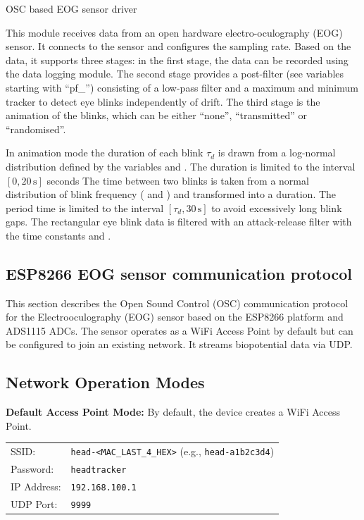 OSC based EOG sensor driver


This module receives data from an open hardware electro-oculography (EOG) sensor. It connects to the sensor and configures the sampling rate. Based on the data, it supports three stages: in the first stage, the data can be recorded using the data logging module. The second stage provides a post-filter (see variables starting with ``pf\_'') consisting of a low-pass filter and a maximum and minimum tracker to detect eye blinks independently of drift. The third stage is the animation of the blinks, which can be either ``none'', ``transmitted'' or ``randomised''.





In animation mode the duration of each blink $\tau_{d}$ is drawn from a log-normal distribution defined by the variables  and . The duration is limited to the interval $[0,20\,\textrm{s}]$ seconds The time between two blinks is taken from a normal distribution of blink frequency ( and ) and transformed into a duration. The period time is limited to the interval $[\tau_{d},30\,\textrm{s}]$ to avoid excessively long blink gaps. The rectangular eye blink data is filtered with an attack-release filter with the time constants  and .

\subsection*{ESP8266 EOG sensor communication protocol}

This section describes the Open Sound Control (OSC) communication protocol for the Electrooculography (EOG) sensor based on the ESP8266 platform and ADS1115 ADCs. The sensor operates as a WiFi Access Point by default but can be configured to join an existing network. It streams biopotential data via UDP.


\subsection*{Network Operation Modes}

{\bf Default Access Point Mode:} By default, the device creates a WiFi Access Point.

\begin{tabular}{|ll|}
\hline
{SSID:}       & \texttt{head-<MAC\_LAST\_4\_HEX>} (e.g., \texttt{head-a1b2c3d4}) \\
{Password:}   & \texttt{headtracker}                                             \\
{IP Address:} & \texttt{192.168.100.1}                                           \\
{UDP Port:}   & \texttt{9999}                                                    \\
\hline
\end{tabular}

